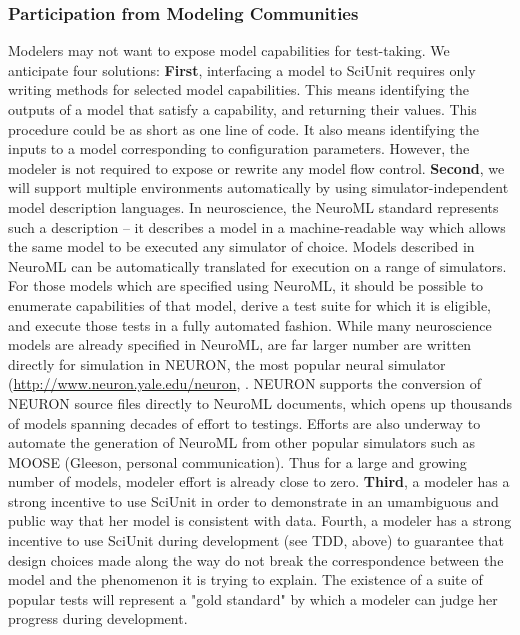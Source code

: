 \documentclass[a4paper,12pt]{article}
\begin{document}
\subsubsection{Participation from Modeling Communities}
Modelers may not want to expose model capabilities for test-taking.  We anticipate four solutions: \textbf{First}, interfacing a model to SciUnit requires only writing methods for selected model capabilities.  This means identifying the outputs of a model that satisfy a capability, and returning their values.  This procedure could be as short as one line of code.  It also means identifying the inputs to a model corresponding to configuration parameters.  However, the modeler is not required to expose or rewrite any model flow control.  \textbf{Second}, we will support multiple environments automatically by using simulator-independent model description languages. In neuroscience, the NeuroML standard represents such a description \cite{gleeson2010} -- it describes a model in a machine-readable way which allows the same model to be executed any simulator of choice.  Models described in NeuroML can be automatically translated for execution on a range of simulators.  For those models which are specified using NeuroML, it should be possible to enumerate capabilities of that model, derive a test suite for which it is eligible, and execute those tests in a fully automated fashion.  While many neuroscience models are already specified in NeuroML, are far larger number are written directly for simulation in NEURON, the most popular neural simulator (\url{http://www.neuron.yale.edu/neuron}, \cite{carnevale2006}.  NEURON supports the conversion of NEURON source files directly to NeuroML documents, which opens up thousands of models spanning decades of effort to testings.  Efforts are also underway to automate the generation of NeuroML from other popular simulators such as MOOSE (Gleeson, personal communication).  Thus for a large and growing number of models, modeler effort is already close to zero.  \textbf{Third}, a modeler has a strong incentive to use SciUnit in order to demonstrate in an umambiguous and public way that her model is consistent with data.  Fourth, a modeler has a strong incentive to use SciUnit during development (see TDD, above) to guarantee that design choices made along the way do not break the correspondence between the model and the phenomenon it is trying to explain.  The existence of a suite of popular tests will represent a "gold standard" by which a modeler can judge her progress during development.
\end{document}
